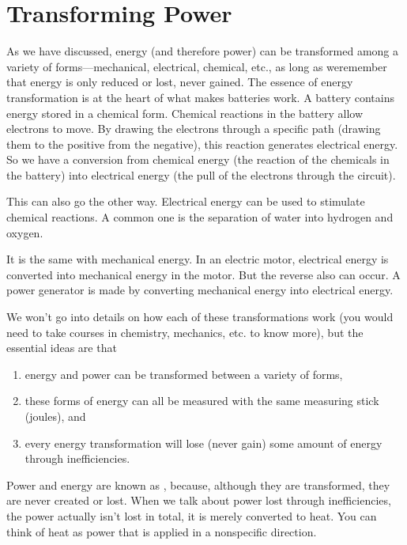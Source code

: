 \section{Transforming Power}

As we have discussed, energy (and therefore power) can be transformed among a variety of forms---mechanical, electrical, chemical, etc., as long as weremember that energy is only reduced or lost, never gained.
The essence of energy transformation is at the heart of what makes batteries work.
A battery contains energy stored in a chemical form.
Chemical reactions in the battery allow electrons to move.
By drawing the electrons through a specific path (drawing them to the positive from the negative), this reaction generates electrical energy.
So we have a conversion from chemical energy (the reaction of the chemicals in the battery) into electrical energy (the pull of the electrons through the circuit).

This can also go the other way.
Electrical energy can be used to stimulate chemical reactions.
A common one is the separation of water into hydrogen and oxygen.

It is the same with mechanical energy.
In an electric motor, electrical energy is converted into mechanical energy in the motor.
But the reverse also can occur.
A power generator is made by converting mechanical energy into electrical energy.

We won't go into details on how each of these transformations work (you would need to take courses in chemistry, mechanics, etc. to know more), but the essential ideas are that

\begin{enumerate}
\item energy and power can be transformed between a variety of forms,
\item these forms of energy can all be measured with the same measuring stick (joules), and
\item every energy transformation will lose (never gain) some amount of energy through inefficiencies.
\end{enumerate}

Power and energy are known as , because, although they are transformed, they are never created or lost.
When we talk about power lost through inefficiencies, the power actually isn't lost in total, it is merely converted to heat.
You can think of heat as power that is applied in a nonspecific direction.

